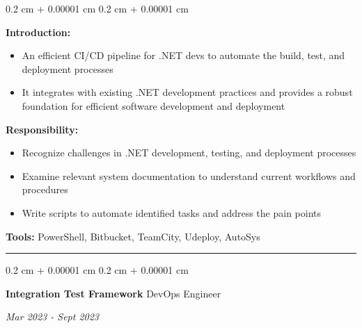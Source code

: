 \documentclass[10pt, letterpaper]{article}
\newenvironment{highlights}{
	\begin{itemize}[
		topsep=0.10 cm,
		parsep=0.10 cm,
		partopsep=0pt,
		itemsep=0pt,
		leftmargin=0.4 cm + 10pt
		]
	}{
	\end{itemize}
} %
\newenvironment{onecolentry}{
	\begin{adjustwidth}{
			0.2 cm + 0.00001 cm
		}{
			0.2 cm + 0.00001 cm
		}
	}{
	\end{adjustwidth}
} %
\newenvironment{twocolentry}[2][]{
	\onecolentry
	\def\secondColumn{#2}
	\setcolumnwidth{\fill, 4.5 cm}
	\begin{paracol}{2}
	}{
		\switchcolumn \raggedleft \secondColumn
	\end{paracol}
	\endonecolentry
} %
\begin{document}
			\vspace{0.10 cm}
			\begin{onecolentry}
				\textbf{Introduction:} 
				\begin{highlights}
					\item An efficient CI/CD pipeline for .NET devs to automate the build, test, and deployment processes
					\item It integrates with existing .NET development practices and provides a robust foundation for efficient software development and deployment
				\end{highlights}
				\textbf{Responsibility:} 
				\begin{highlights}
					\item Recognize challenges in .NET development, testing, and deployment processes
					\item Examine relevant system documentation to understand current workflows and procedures
					\item Write scripts to automate identified tasks and address the pain points
				\end{highlights}
				\textbf{Tools:} PowerShell, Bitbucket, TeamCity, Udeploy, AutoSys
			\end{onecolentry}
			\vspace{0.4 cm}
			\hrule
			
			\vspace{0.4 cm}
			\begin{twocolentry}{	
				\textit{Mar 2023 - Sept 2023}}
				\textbf{Integration Test Framework}
				\space\space\space\space\space\space\space\space\space\space\space\space DevOps Engineer
			\end{twocolentry}
			
\end{document}
